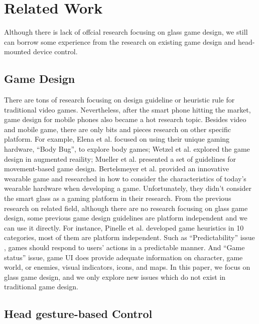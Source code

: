 \section{Related Work}

Although there is lack of offcial research focusing on glass game design, we still can borrow some experience from the research on existing game design and head-mounted device control.


\subsection{Game Design}

There are tons of research focusing on design guideline or heuristic rule for traditional video games\cite{gameflow,criticalreview,chi04game,09game,02game,08game,07game}. Nevertheless, after the smart phone hitting the market, game design for mobile phones also became a hot research topic\cite{mobilegame,mobile06,mobile08,icec06}. Besides video and mobile game, there are only bits and pieces research on other specific platform. For example, Elena et al. focused on using their unique gaming hardware, ``Body Bug'', to explore body games\cite{bodygame}; Wetzel et al. explored the game design in augmented reaility\cite{argame}; Mueller et al. presented a set of guidelines for movement-based game design\cite{movegame}. Bertelsmeyer et al. provided an innovative wearable game and researched in how to consider the characteristics of today's wearable hardware when developing a game\cite{wearable}. Unfortunately, they didn't consider the smart glass as a gaming platform in their research. 
From the previous research on related field, although there are no research focusing on glass game design, some previous game design guidelines are platform independent and we can use it directly. For instance, Pinelle et al.\cite{videogame} developed game heuristics in 10 categories, most of them are platform independent. 
Such as ``Predictability'' issue , games should respond to users' actions in a predictable manner. And ``Game status'' issue, game UI does provide adequate information on character, game world, or enemies, visual indicators, icons, and maps. 
In this paper, we focus on glass game design, and we only explore new issues which do not exist in traditional game design.


\subsection{Head gesture-based Control}

